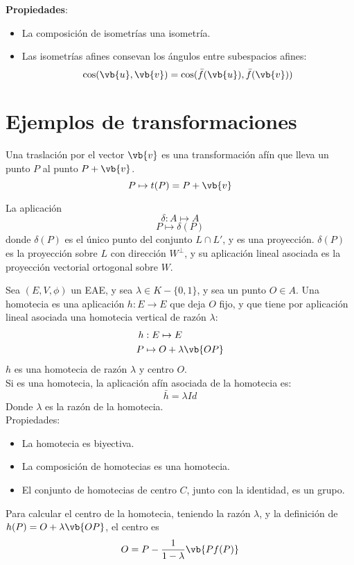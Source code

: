 \documentclass{./Geometria.tex}
\begin{document}
\textbf{Propiedades}:
\begin{itemize}
	\item La composición de isometrías una isometría.
	\item Las isometrías afines consevan los ángulos entre subespacios afines:
		\[
			\cos (\vb{u}, \vb{v}) = \cos (\bar{f}(\vb{u}), \bar{f}(\vb{v}))
		\]
\end{itemize}
\section{Ejemplos de transformaciones}
\begin{defin}
Una traslación por el vector $\vb{v}$ es una transformación afín que lleva un punto $P$ al punto $P + \vb{v}$.
\[
	P \mapsto t(P) = P+\vb{v}
\]
\end{defin}
\begin{defin}
La aplicación
\[
	\delta:A \mapsto A
\]
\[
	P \mapsto \delta(P)
\]
donde $\delta(P)$ es el único punto del conjunto $L \cap L'$, y es una proyección. $\delta(P)$ es la proyección sobre $L$ con dirección $W^{\perp}$, y su aplicación lineal asociada es la proyección vectorial ortogonal sobre $W$.
\end{defin}
\pagebreak
\begin{defin}[Homotecia]
Sea $(E, V, \phi)$ un EAE, y sea $\lambda \in K - \{ 0,1 \}$, y sea un punto $O \in A$. Una homotecia es una aplicación $h: E \to E$ que deja $O$ fijo, y que tiene por aplicación lineal asociada una homotecia vertical de razón $\lambda$:
\begin{equation}
	\begin{split}
		h&: E \mapsto E\\
		P &\mapsto O + \lambda \vb{OP}
	\end{split}
\end{equation}
$h$ es una homotecia de razón $\lambda$ y centro $O$.\\
Si es una homotecia, la aplicación afín asociada de la homotecia es:
\[
	\bar{h} = \lambda Id
\]
Donde $\lambda$ es la razón de la homotecia.\\
Propiedades:
\begin{itemize}
	\item La homotecia es biyectiva.
	\item La composición de homotecias es una homotecia.
	\item El conjunto de homotecias de centro $C$, junto con la identidad, es un grupo.
\end{itemize}
\end{defin}
Para calcular el centro de la homotecia, teniendo la razón $\lambda$, y la definición de $h(P) = O + \lambda \vb{OP}$, el centro es
\[
	O = P- \frac{1}{1-\lambda} \vb{P f(P)}
\]
\pagebreak
\end{document}

